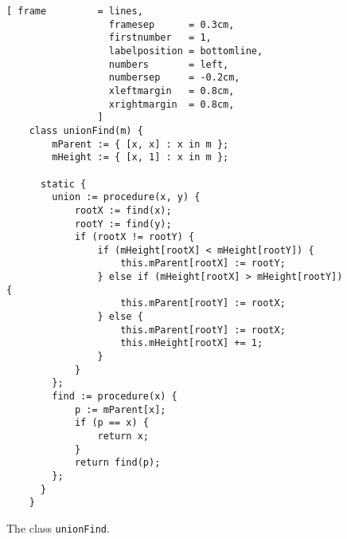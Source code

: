 \begin{figure}[!ht]
\centering
\begin{Verbatim}[ frame         = lines, 
                  framesep      = 0.3cm, 
                  firstnumber   = 1,
                  labelposition = bottomline,
                  numbers       = left,
                  numbersep     = -0.2cm,
                  xleftmargin   = 0.8cm,
                  xrightmargin  = 0.8cm,
                ]
    class unionFind(m) {
        mParent := { [x, x] : x in m };
        mHeight := { [x, 1] : x in m };
        
      static {
        union := procedure(x, y) {
            rootX := find(x);
            rootY := find(y);
            if (rootX != rootY) {
                if (mHeight[rootX] < mHeight[rootY]) {
                    this.mParent[rootX] := rootY;  
                } else if (mHeight[rootX] > mHeight[rootY]) {
                    this.mParent[rootY] := rootX;  
                } else {
                    this.mParent[rootY] := rootX;  
                    this.mHeight[rootX] += 1;
                }
            }
        };
        find := procedure(x) {
            p := mParent[x]; 
            if (p == x) {
                return x;
            }
            return find(p);
        };
      }
    }
\end{Verbatim}
\vspace*{-0.3cm}
\caption{The class \texttt{unionFind}.}
\label{fig:union-find-oo.stlx}
\end{figure}

